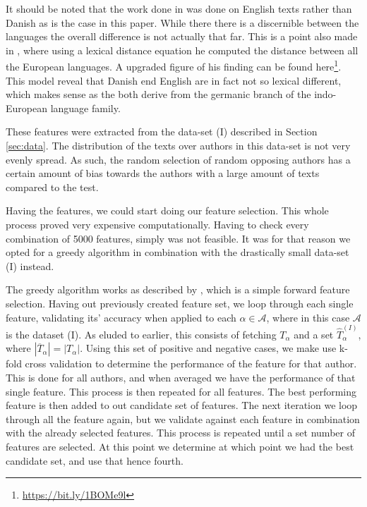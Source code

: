 It should be noted that the work done in \citet{US} was done on English
texts rather than Danish as is the case in this paper. While there there is
a discernible between the languages the overall difference is not actually
that far. This is a point also made in \citet{konstantin:2000}, where
using a lexical distance equation he computed the distance between all
the European languages. A upgraded figure of his finding can be found
here\footnote{\url{https://bit.ly/1BOMe9l}}. This model reveal
that Danish end English are in fact not so lexical different, which makes sense
as the both derive from the germanic branch of the indo-European language
family.

These features were extracted from the data-set (I) described in Section
\ref{sec:data}. The distribution of the texts over authors in this data-set is
not very evenly spread. As such, the random selection of random opposing authors
has a certain amount of bias towards the authors with a large amount of texts
compared to the test.

Having the features, we could start doing our feature selection. This whole
process proved very expensive computationally. Having to check every combination
of 5000 features, simply was not feasible. It was for that reason we opted for a
greedy algorithm in combination with the drastically small data-set (I) instead.

The greedy algorithm works as described by \citet{kanDeng}, which is a simple
forward feature selection. Having out previously created feature set, we loop
through each single feature, validating its' accuracy when applied to each
$\alpha \in \mathcal{A}$, where in this case $\mathcal{A}$ is the dataset
(I). As eluded to earlier, this consists of fetching $T_{\alpha}$ and a set
$\hat{T}^{(I)}_{\alpha}$, where $|\overline{T}_\alpha| = |T_\alpha|$. Using
this set of positive and negative cases, we make use k-fold cross validation
to determine the performance of the feature for that author. This is done for
all authors, and when averaged we have the performance of that single feature.
This process is then repeated for all features. The best performing feature is
then added to out candidate set of features. The next iteration we loop through
all the feature again, but we validate against each feature in combination with
the already selected features. This process is repeated until a set number of
features are selected. At this point we determine at which point we had the best
candidate set, and use that hence fourth.

